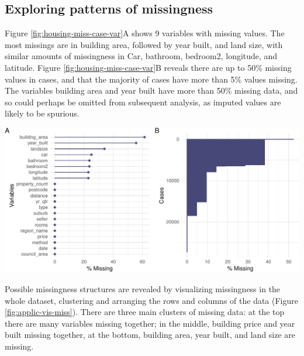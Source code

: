 \documentclass[]{article}
\let\origfigure\figure
\let\endorigfigure\endfigure
\renewenvironment{figure}[1][2] {
    \expandafter\origfigure\expandafter[H]
} {
    \endorigfigure
}
\theoremstyle{definition}
\theoremstyle{definition}
\theoremstyle{definition}
\theoremstyle{remark}
\begin{document}
\hypertarget{case-study-explore-pattern}{%
\subsection{Exploring patterns of
missingness}\label{case-study-explore-pattern}}

Figure \ref{fig:housing-miss-case-var}A shows 9 variables with missing
values. The most missings are in building area, followed by year built,
and land size, with similar amounts of missingness in Car, bathroom,
bedroom2, longitude, and latitude. Figure
\ref{fig:housing-miss-case-var}B reveals there are up to 50\% missing
values in cases, and that the majority of cases have more than 5\%
values missing. The variables building area and year built have more
than 50\% missing data, and so could perhaps be omitted from subsequent
analysis, as imputed values are likely to be spurious.

\begin{figure}

{\centering \includegraphics[width=1\linewidth]{tidy-missing-data-paper_files/figure-latex/housing-miss-case-var-1} 

}

\caption{The amount of missings in each variable (A) and in each case (B) for Melbourne housing data. (A) Build area and year built have more than 50\% missing values, and car, bathroom, bedroom2 and longitude and latitude have about 25\% missings. (B) There are between 5 and 50\% missing values in cases. There are many missing values in the data, with the majority of missingness being in selected cases and variables.}\label{fig:housing-miss-case-var}
\end{figure}

Possible missingness structures are revealed by visualizing missingness
in the whole dataset, clustering and arranging the rows and columns of
the data (Figure \ref{fig:applic-vis-miss}). There are three main
clusters of missing data: at the top there are many variables missing
together; in the middle, building price and year built missing together,
at the bottom, building area, year built, and land size are missing.
\end{document}
